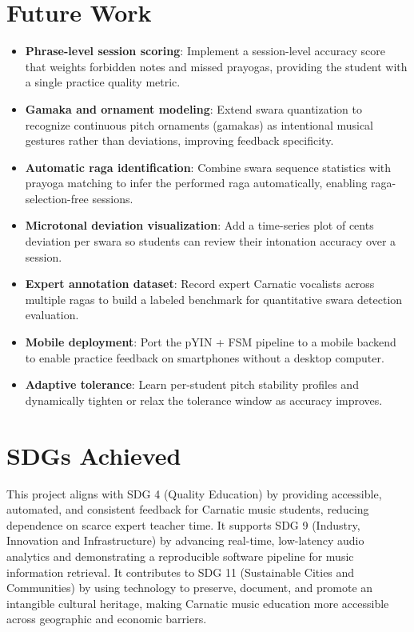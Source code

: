\documentclass[12pt,a4paper]{report}
\numberwithin{equation}{chapter}
\begin{document}
\section{Future Work}
\begin{itemize}
    \item \textbf{Phrase-level session scoring}: Implement a session-level accuracy score that weights forbidden notes and missed prayogas, providing the student with a single practice quality metric.
    \item \textbf{Gamaka and ornament modeling}: Extend swara quantization to recognize continuous pitch ornaments (gamakas) as intentional musical gestures rather than deviations, improving feedback specificity.
    \item \textbf{Automatic raga identification}: Combine swara sequence statistics with prayoga matching to infer the performed raga automatically, enabling raga-selection-free sessions.
    \item \textbf{Microtonal deviation visualization}: Add a time-series plot of cents deviation per swara so students can review their intonation accuracy over a session.
    \item \textbf{Expert annotation dataset}: Record expert Carnatic vocalists across multiple ragas to build a labeled benchmark for quantitative swara detection evaluation.
    \item \textbf{Mobile deployment}: Port the pYIN + FSM pipeline to a mobile backend to enable practice feedback on smartphones without a desktop computer.
    \item \textbf{Adaptive tolerance}: Learn per-student pitch stability profiles and dynamically tighten or relax the tolerance window as accuracy improves.
\end{itemize}

\section{SDGs Achieved}
This project aligns with SDG 4 (Quality Education) by providing accessible, automated, and consistent feedback for Carnatic music students, reducing dependence on scarce expert teacher time. It supports SDG 9 (Industry, Innovation and Infrastructure) by advancing real-time, low-latency audio analytics and demonstrating a reproducible software pipeline for music information retrieval. It contributes to SDG 11 (Sustainable Cities and Communities) by using technology to preserve, document, and promote an intangible cultural heritage, making Carnatic music education more accessible across geographic and economic barriers.
\end{document}

